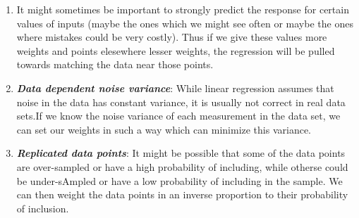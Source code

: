 \documentclass[11pt]{article}
\begin{document}
\begin{enumerate}
\def\labelenumi{\arabic{enumi}.}
\item
  It might sometimes be important to strongly predict the response for
  certain values of inputs (maybe the ones which we might see often or
  maybe the ones where mistakes could be very costly). Thus if we give
  these values more weights and points elesewhere lesser weights, the
  regression will be pulled towards matching the data near those points.
\item
  \textbf{\emph{Data dependent noise variance}}: While linear regression
  assumes that noise in the data has constant variance, it is usually
  not correct in real data sets.If we know the noise variance of each
  measurement in the data set, we can set our weights in such a way
  which can minimize this variance.
\item
  \textbf{\emph{Replicated data points}}: It might be possible that some
  of the data points are over-sampled or have a high probability of
  including, while otherse could be under-sAmpled or have a low
  probability of including in the sample. We can then weight the data
  points in an inverse proportion to their probability of inclusion.
\end{enumerate}


    
    
    
    
\end{document}
